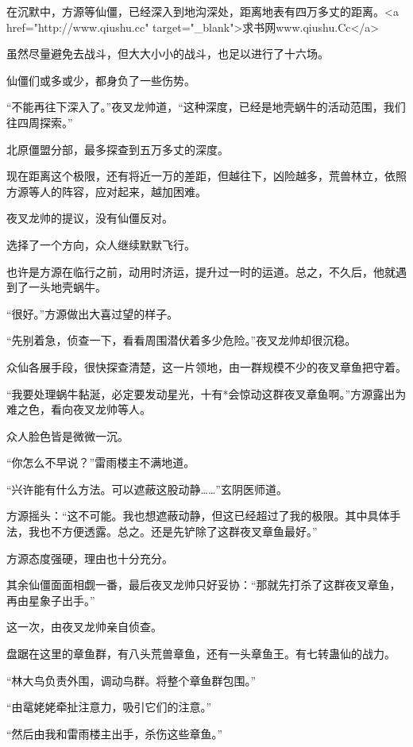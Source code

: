 
\begin{this_body}

在沉默中，方源等仙僵，已经深入到地沟深处，距离地表有四万多丈的距离。<a href="http://www.qiushu.cc" target="\_blank">求书网www.qiushu.Cc</a>

虽然尽量避免去战斗，但大大小小的战斗，也足以进行了十六场。

仙僵们或多或少，都身负了一些伤势。

“不能再往下深入了。”夜叉龙帅道，“这种深度，已经是地壳蜗牛的活动范围，我们往四周探索。”

北原僵盟分部，最多探查到五万多丈的深度。

现在距离这个极限，还有将近一万的差距，但越往下，凶险越多，荒兽林立，依照方源等人的阵容，应对起来，越加困难。

夜叉龙帅的提议，没有仙僵反对。

选择了一个方向，众人继续默默飞行。

也许是方源在临行之前，动用时济运，提升过一时的运道。总之，不久后，他就遇到了一头地壳蜗牛。

“很好。”方源做出大喜过望的样子。

“先别着急，侦查一下，看看周围潜伏着多少危险。”夜叉龙帅却很沉稳。

众仙各展手段，很快探查清楚，这一片领地，由一群规模不少的夜叉章鱼把守着。

“我要处理蜗牛黏涎，必定要发动星光，十有*会惊动这群夜叉章鱼啊。”方源露出为难之色，看向夜叉龙帅等人。

众人脸色皆是微微一沉。

“你怎么不早说？”雷雨楼主不满地道。

“兴许能有什么方法。可以遮蔽这股动静……”玄阴医师道。

方源摇头：“这不可能。我也想遮蔽动静，但这已经超过了我的极限。其中具体手法，我也不方便透露。总之。还是先铲除了这群夜叉章鱼最好。”

方源态度强硬，理由也十分充分。

其余仙僵面面相觑一番，最后夜叉龙帅只好妥协：“那就先打杀了这群夜叉章鱼，再由星象子出手。”

这一次，由夜叉龙帅亲自侦查。

盘踞在这里的章鱼群，有八头荒兽章鱼，还有一头章鱼王。有七转蛊仙的战力。

“林大鸟负责外围，调动鸟群。将整个章鱼群包围。”

“由鼋姥姥牵扯注意力，吸引它们的注意。”

“然后由我和雷雨楼主出手，杀伤这些章鱼。”


\end{this_body}
